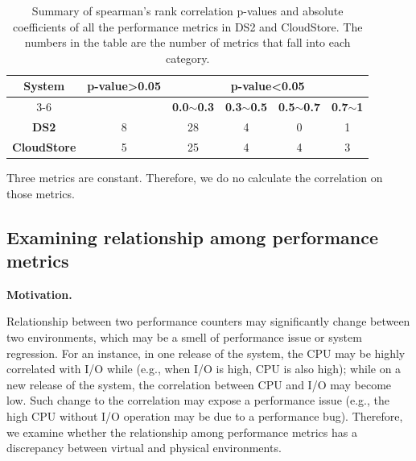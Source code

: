 \begin{table}[tbh]
	\centering
	\caption{Summary of spearman's rank correlation p-values and absolute coefficients of all the performance metrics in DS2 and CloudStore. The numbers in the table are the number of metrics that fall into each category.}
	\label{tab:correlationall}
	\begin{threeparttable}
  
		\begin{tabular}{|c||c|c|c|c|c|}
			\hline
			\multirow{3}{*}{\textbf{System}} & \multirow{3}{*}{\textbf{p-value\textgreater0.05}} & \multicolumn{4}{c|}{\textbf{p-value\textless0.05}} \\ \cline{3-6} 
			&  & \textbf{0.0$\sim$0.3} & \textbf{0.3$\sim$0.5} & \textbf{0.5$\sim$0.7} & \textbf{0.7$\sim$1} \\ %
			\midrule 
			\midrule 
			\textbf{DS2} & 8 & 28 & 4 & 0 & 1 \\ \hline
			\textbf{CloudStore} & 5 & 25 & 4 & 4 & 3 \\ \hline
		\end{tabular}%
		\begin{tablenotes}
			\item Three metrics are constant. Therefore, we do no calculate the correlation on those metrics.
		\end{tablenotes}
		\end{threeparttable}
	  
\end{table}



\subsection{Examining relationship among performance metrics}
\label{sec:relation}
\noindent \textbf{Motivation.}

Relationship between two performance counters may significantly change between two environments, which may be a smell of performance issue or system regression. For an instance, in one release of the system, the CPU may be highly correlated with I/O while (e.g., when I/O is high, CPU is also high); while on a new release of the system, the correlation between CPU and I/O may become low. Such change to the correlation may expose a performance issue (e.g., the high CPU without I/O operation may be due to a performance bug). Therefore, we examine whether the relationship among performance metrics has a discrepancy between virtual and physical environments. 


